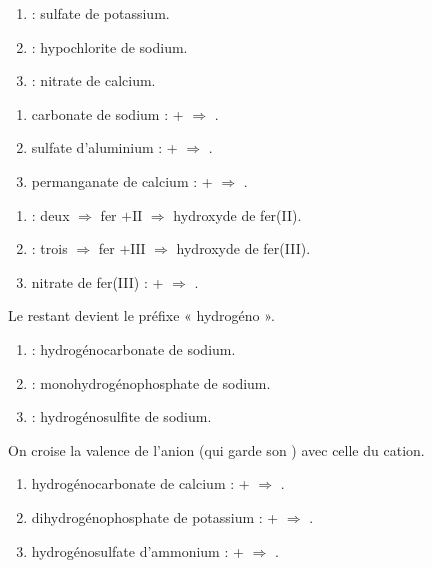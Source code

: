 \documentclass[11pt,a4paper]{article}
\begin{document}
\begin{corrige}
\begin{enumerate}[label=\alph*)]
  \item {} : sulfate de potassium.
  \item {} : hypochlorite de sodium.
  \item {} : nitrate de calcium.
\end{enumerate}
\end{corrige}

\begin{corrige}
\begin{enumerate}[label=\alph*)]
  \item carbonate de sodium :  +  $\Rightarrow$ .
  \item sulfate d'aluminium :  +  $\Rightarrow$ .
  \item permanganate de calcium :  +  $\Rightarrow$ .
\end{enumerate}
\end{corrige}

\begin{corrige}
\begin{enumerate}[label=\alph*)]
  \item {} : deux  $\Rightarrow$ fer $+\mathrm{II}$ $\Rightarrow$ hydroxyde de fer(II).
  \item {} : trois  $\Rightarrow$ fer $+\mathrm{III}$ $\Rightarrow$ hydroxyde de fer(III).
  \item nitrate de fer(III) :  +  $\Rightarrow$ .
\end{enumerate}
\end{corrige}

\begin{corrige}
Le  restant devient le préfixe « hydrogéno ».
\begin{enumerate}[label=\alph*)]
  \item {} : hydrogénocarbonate de sodium.
  \item {} : monohydrogénophosphate de sodium.
  \item {} : hydrogénosulfite de sodium.
\end{enumerate}
\end{corrige}

\begin{corrige}
On croise la valence de l'anion (qui garde son ) avec celle du cation.
\begin{enumerate}[label=\alph*)]
  \item hydrogénocarbonate de calcium :  +  $\Rightarrow$ .
  \item dihydrogénophosphate de potassium :  +  $\Rightarrow$ .
  \item hydrogénosulfate d'ammonium :  +  $\Rightarrow$ .
\end{enumerate}
\end{corrige}
\end{document}
